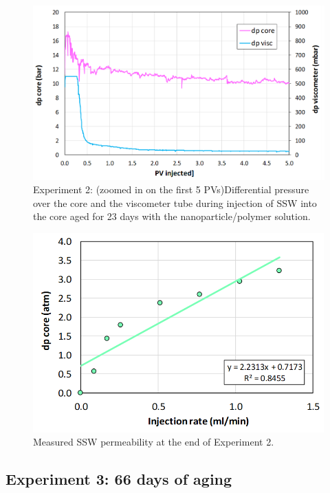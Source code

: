 \begin{figure}[h!]
    \centering
    \includegraphics[width=\textwidth]{img/cht/gelexp2_3.png}
    \caption{Experiment 2: (zoomed in on the first 5 PVs)Differential pressure over the core and the viscometer tube during injection of SSW into the core aged for 23 days with the nanoparticle/polymer solution.}
    \label{cht:gelexp2_3} %
\end{figure}

\begin{figure}[h!]
    \centering
    \includegraphics[width=\textwidth]{img/cht/gelexp2_4.png}
    \caption{Measured SSW permeability at the end of Experiment 2.}
    \label{cht:gelexp2_4} %
\end{figure}

\FloatBarrier
\subsection{Experiment 3: 66 days of aging}

